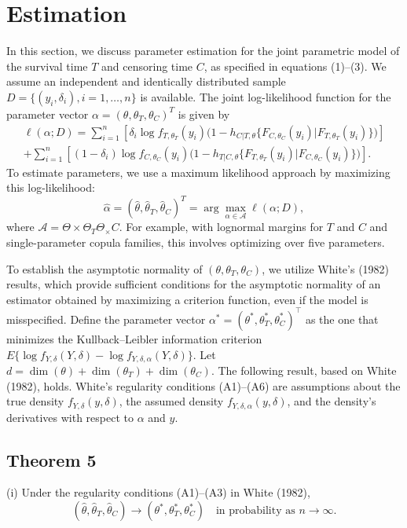 \section{Estimation}
In this section, we discuss parameter estimation for the joint parametric model of the survival time \(T\) and censoring time \(C\), as specified in equations (1)–(3). We assume an independent and identically distributed sample \(D = \{(y_i, \delta_i), i=1, \dots, n\}\) is available. The joint log-likelihood function for the parameter vector \(\alpha = (\theta, \theta_T, \theta_C)^T\) is given by
\begin{align*}
\ell(\alpha; D) = \sum_{i=1}^n \left[ \delta_i \log f_{T, \theta_T}(y_i) \big( 1 - h_{C|T, \theta} \{ F_{C, \theta_C}(y_i) | F_{T, \theta_T}(y_i) \} \big) \right] \\
+ \sum_{i=1}^n \left[ (1 - \delta_i) \log f_{C, \theta_C}(y_i) \big( 1 - h_{T|C, \theta} \{ F_{T, \theta_T}(y_i) | F_{C, \theta_C}(y_i) \} \big) \right].
\end{align*}
To estimate parameters, we use a maximum likelihood approach by maximizing this log-likelihood:
\[
\hat{\alpha} = (\hat{\theta}, \hat{\theta}_T, \hat{\theta}_C)^T = \arg \max_{\alpha \in \mathcal{A}} \ell(\alpha; D),
\]
where \(\mathcal{A} = \Theta \times \Theta_T \Theta_\times C\). For example, with lognormal margins for \(T\) and \(C\) and single-parameter copula families, this involves optimizing over five parameters. 

To establish the asymptotic normality of \((\theta, \theta_T, \theta_C)\), we utilize White’s (1982)\cite{5805f73c-4dfa-385e-bd6d-68424fb9f5be} results, which provide sufficient conditions for the asymptotic normality of an estimator obtained by maximizing a criterion function, even if the model is misspecified. Define the parameter vector \(\alpha^* = (\theta^*, \theta_T^*, \theta_C^*)^\top\) as the one that minimizes the Kullback–Leibler information criterion \(E\{\log f_{Y, \delta}(Y, \delta) - \log f_{Y, \delta, \alpha}(Y, \delta)\}\). Let \(d = \dim(\theta) + \dim(\theta_T) + \dim(\theta_C)\). The following result, based on White (1982), holds. White’s regularity conditions (A1)–(A6) are assumptions about the true density \(f_{Y, \delta}(y, \delta)\), the assumed density \(f_{Y, \delta, \alpha}(y, \delta)\), and the density’s derivatives with respect to \(\alpha\) and \(y\).

\subsection*{Theorem 5}
(i) Under the regularity conditions (A1)–(A3) in White (1982)\cite{5805f73c-4dfa-385e-bd6d-68424fb9f5be},
\[
(\hat{\theta}, \hat{\theta}_T, \hat{\theta}_C) \to (\theta^*, \theta_T^*, \theta_C^*) \quad \text{in probability as } n \to \infty.
\]


